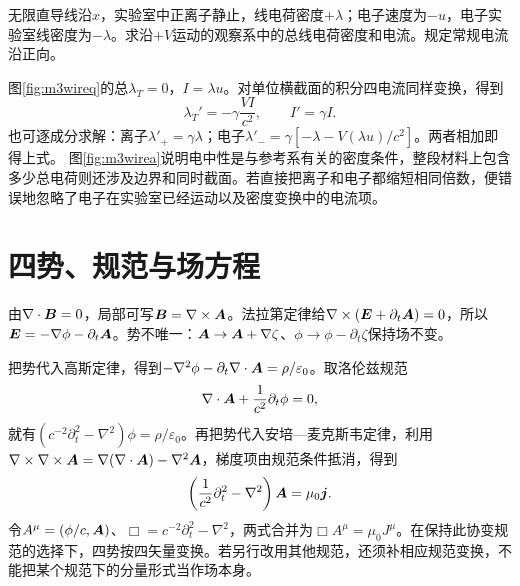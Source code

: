 \begin{example}\label{ex:m3wire}
无限直导线沿$x$，实验室中正离子静止，线电荷密度$+\lambda$；电子速度为$-u$，电子实验室线密度为$-\lambda$。求沿$+V$运动的观察系中的总线电荷密度和电流。规定常规电流沿正向。
\end{example}
\begin{solution}
图\ref{fig:m3wireq}的总$\lambda_T=0$，$I=\lambda u$。对单位横截面的积分四电流同样变换，得到
\[
 \lambda_T'=-\gamma\frac{VI}{c^2},\qquad I'=\gamma I.
\]
也可逐成分求解：离子$\lambda'_+=\gamma\lambda$；电子$\lambda'_- =\gamma[-\lambda-V(\lambda u)/c^2]$。两者相加即得上式。
图\ref{fig:m3wirea}说明电中性是与参考系有关的密度条件，整段材料上包含多少总电荷则还涉及边界和同时截面。若直接把离子和电子都缩短相同倍数，便错误地忽略了电子在实验室已经运动以及密度变换中的电流项。
\end{solution}

\section{四势、规范与场方程}\label{th:m3potential}
由$\nabla\cdot\bm{B}=0$，局部可写$\bm{B}=\nabla\times\bm{A}$。法拉第定律给$\nabla\times(\bm{E}+\partial_t\bm{A})=0$，所以$\bm{E}=-\nabla\phi-\partial_t\bm{A}$。势不唯一：$\bm{A}\to\bm{A}+\nabla\zeta$、$\phi\to\phi-\partial_t\zeta$保持场不变。

把势代入高斯定律，得到$-\nabla^2\phi-\partial_t\nabla\cdot\bm{A}=\rho/\varepsilon_0$。取洛伦兹规范
\[
 \nabla\cdot\bm{A}+\frac1{c^2}\partial_t\phi=0,
\]
就有$(c^{-2}\partial_t^2-\nabla^2)\phi=\rho/\varepsilon_0$。再把势代入安培—麦克斯韦定律，利用$\nabla\times\nabla\times\bm{A}=\nabla(\nabla\cdot\bm{A})-\nabla^2\bm{A}$，梯度项由规范条件抵消，得到
\[
 \left(\frac1{c^2}\partial_t^2-\nabla^2\right)\bm{A}=\mu_0\bm{j}.
\]
令$A^\mu=(\phi/c,\bm{A})$、$\Box=c^{-2}\partial_t^2-\nabla^2$，两式合并为$\Box A^\mu=\mu_0J^\mu$。在保持此协变规范的选择下，四势按四矢量变换。若另行改用其他规范，还须补相应规范变换，不能把某个规范下的分量形式当作场本身。

